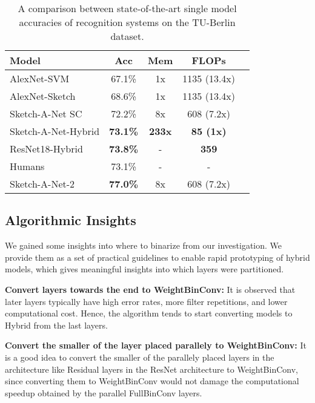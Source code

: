 \documentclass[10pt,twocolumn,letterpaper]{article}
\begin{document}
\begin{table}[t]
\begin{center}
\begin{tabular}{|l|c|c|c|l|}
\hline{\bf Model} & {\bf Acc} & {\bf Mem} & {\bf FLOPs}\\
\hline
AlexNet-SVM & 67.1\% & 1x & 1135 (13.4x)\\
AlexNet-Sketch & 68.6\% & 1x & 1135 (13.4x)\\
Sketch-A-Net SC & 72.2\% & 8x & 608 (7.2x)\\
\hline
Sketch-A-Net-Hybrid & {\bf 73.1\%} & {\bf 233x} & {\bf 85 (1x)}\\
ResNet18-Hybrid & {\bf 73.8\%} & - & {\bf 359 }\\
\hline
Humans & {73.1\%} & - & - \\
Sketch-A-Net-2  \footnotemark \cite{yu2017sketch} & {\bf 77.0\%} & 8x & 608 (7.2x)\\
\hline
\end{tabular}
\end{center}
\vspace{-0.5cm}
\caption{A comparison between state-of-the-art single model accuracies of recognition systems on the TU-Berlin dataset.}
\label{table:sketchcomp}
\vspace{-0.5cm}
\end{table}

\subsection{Algorithmic Insights}
We gained some insights into where to binarize from our investigation. We provide them as a set of practical guidelines to enable rapid prototyping of hybrid models, which gives meaningful insights into which layers were partitioned.

{\bf Convert layers towards the end to WeightBinConv:} It is observed that later layers typically have high error rates, more filter repetitions, and lower computational cost. Hence, the algorithm tends to start converting models to Hybrid from the last layers. 

{\bf Convert the smaller of the layer placed parallely to WeightBinConv:} It is a good idea to convert the smaller of the parallely placed layers in the architecture like Residual layers in the ResNet architecture to WeightBinConv, since converting them to WeightBinConv would not damage the computational speedup obtained by the parallel FullBinConv layers.
\end{document}

